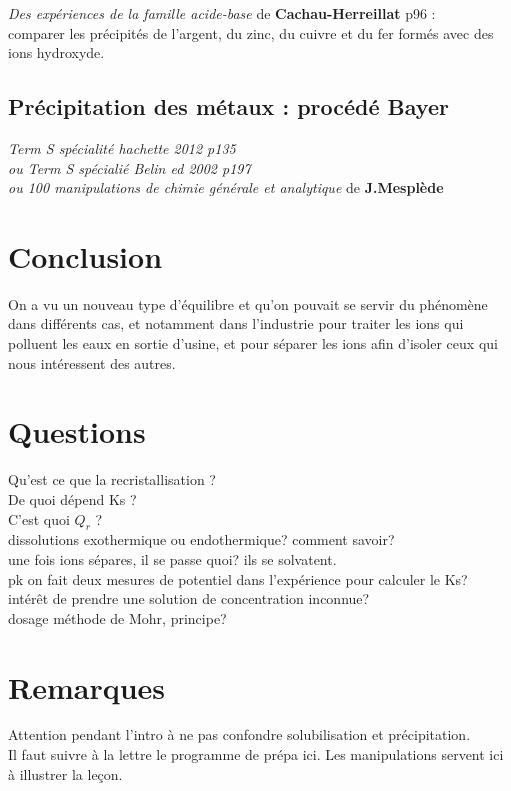 \documentclass[12pt,prb,aps,epsf]{article}
\begin{document}
\textit{Des expériences de la famille acide-base} de \textbf{Cachau-Herreillat} p96 :\\ comparer les précipités de l'argent, du zinc, du cuivre et du fer formés avec des ions hydroxyde.

\subsection{Précipitation des métaux : procédé Bayer}
\textit{Term S spécialité hachette 2012 p135\\ ou Term S spécialié Belin ed 2002 p197\\ ou 100 manipulations de chimie générale et analytique} de \textbf{J.Mesplède}

\section{Conclusion}
On a vu un nouveau type d'équilibre et qu'on pouvait se servir du phénomène dans différents cas, et notamment dans l'industrie pour traiter les ions qui polluent les eaux en sortie d'usine, et pour séparer les ions afin d'isoler ceux qui nous intéressent des autres.

\section*{Questions}
Qu'est ce que la recristallisation ?\\

De quoi dépend Ks ?\\

C'est quoi $Q_r$ ?\\

dissolutions exothermique ou endothermique? comment savoir? \\
une fois ions sépares, il se passe quoi? ils se solvatent.\\

pk on fait deux mesures de potentiel dans l'expérience pour calculer le Ks?\\

intérêt de prendre une solution de concentration inconnue? \\

dosage méthode de Mohr, principe?\\

\section*{Remarques}
Attention pendant l'intro à ne pas confondre solubilisation et précipitation.\\
Il faut suivre à la lettre le programme de prépa ici. Les manipulations servent ici à illustrer la leçon.\\
\end{document}
